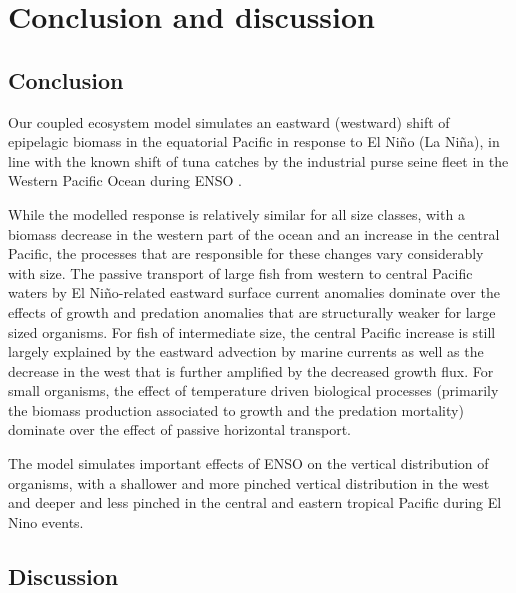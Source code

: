 \section{Conclusion and discussion}
\label{sec:conclusion}


\subsection{Conclusion}

Our coupled ecosystem model simulates an eastward (westward) shift of epipelagic biomass in the equatorial Pacific in response to El Niño (La Niña), in line with the known shift of tuna catches by the industrial purse seine fleet in the Western Pacific Ocean during ENSO \citep{lehodeyNinoSouthernOscillation1997}.

While the modelled response is relatively similar for all size classes, with a biomass decrease in the western part of the ocean and an increase in the central Pacific, the processes that are responsible for these changes vary considerably with size. The passive transport of large fish from western to central Pacific waters by El Niño-related eastward surface current anomalies dominate over the effects of growth and predation anomalies that are structurally weaker for large sized organisms. For fish of intermediate size, the central Pacific increase is still largely explained by the eastward advection by marine currents as well as the decrease in the west that is further amplified by the decreased growth flux. For small organisms, the effect of temperature driven biological processes (primarily the biomass production associated to growth and the predation mortality) dominate over the effect of passive horizontal transport.

The model simulates important effects of ENSO on the vertical distribution of organisms, with a shallower and more pinched vertical distribution in the west and deeper and less pinched in the central and eastern tropical Pacific during El Nino events.

\subsection{Discussion}

